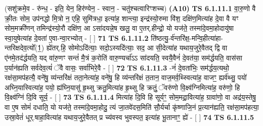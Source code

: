 \documentclass[17pt]{extarticle}
\begin{document}
                  \newline
                      (सशु॑क्रमे॒व - रु॑न्ध॒ - इति॒ येन॒ हिर॑ण्येन॒ - स्वान॒ - चतु॑श्चत्वारिꣳशच्च)  \textbf{(A10)} \newline \newline
                                        \textbf{ TS 6.1.11.1} \newline
                  वा॒रु॒णो वै क्री॒तः सोम॒ उप॑नद्धो मि॒त्रो न॒ एहि॒ सुमि॑त्रधा॒ इत्या॑ह॒ शान्त्या॒ इन्द्र॑स्यो॒रुमा वि॑श॒ दक्षि॑ण॒मित्या॑ह दे॒वा वै यꣳ सोम॒मक्री॑णन् तमिन्द्र॑स्यो॒रौ दक्षि॑ण॒ आ ऽसा॑दयन्ने॒ष खलु॒ वा ए॒तर्.हीन्द्रो॒ यो यज॑ते॒ तस्मा॑दे॒वमा॒होदायु॑षा स्वा॒युषेत्या॑ह दे॒वता॑ ए॒वा-न्वा॒रभ्योत् - [  ] \textbf{  71} \newline
                  \newline
                                \textbf{ TS 6.1.11.2} \newline
                  ति॑ष्ठत्यु॒-र्व॑न्तरि॑क्ष॒-मन्वि॒हीत्या॑हा-न्तरिक्षदेव॒त्यो᳚(1॒) ह्ये॑तर्.हि॒ सोमोऽदि॑त्याः॒ सदो॒ऽस्यदि॑त्याः॒ सद॒ आ सी॒देत्या॑ह यथाय॒जुरे॒वैतद् द्वि वा ए॑नमे॒तद॑र्द्धयति॒ यद् वा॑रु॒णꣳ सन्तं॑ मै॒त्रं क॒रोति॑ वारु॒ण्यर्चा॑ऽऽ सा॑दयति॒ स्वयै॒वैनं॑ दे॒वत॑या॒ सम॑र्द्धयति॒ वास॑सा प॒र्यान॑ह्यति सर्वदेव॒त्यं॑ ॅवै वासः॒ सर्वा॑भिरे॒वै - [  ] \textbf{  72} \newline
                  \newline
                                \textbf{ TS 6.1.11.3} \newline
                  -नं॑ दे॒वता॑भिः॒ सम॑र्द्धय॒त्यथो॒ रक्ष॑सा॒मप॑हत्यै॒ वने॑षु॒ व्य॑न्तरि॑क्षं तता॒नेत्या॑ह॒ वने॑षु॒ हि व्य॑न्तरि॑क्षं त॒तान॒ वाज॒मर्व॒थ्स्वित्या॑ह॒ वाजꣳ॒॒ ह्यर्व॑थ्सु॒ पयो॑ अघ्नि॒यास्वित्या॑ह॒ पयो॒ ह्य॑घ्नि॒यासु॑ हृ॒थ्सु क्रतु॒मित्या॑ह हृ॒थ्सु हि क्रतुं॒ ॅवरु॑णो वि॒क्ष्व॑ग्निमित्या॑ह॒ वरु॑णो॒ हि वि॒क्ष्व॑ग्निं दि॒वि सूर्य॒ - [  ] \textbf{  73} \newline
                  \newline
                                \textbf{ TS 6.1.11.4} \newline
                  मित्या॑ह दि॒वि हि सूर्यꣳ॒॒ सोम॒मद्रा॒वित्या॑ह॒ ग्रावा॑णो॒ वा अद्र॑य॒स्तेषु॒ वा ए॒ष सोमं॑ दधाति॒ यो यज॑ते॒ तस्मा॑दे॒वमा॒होदु॒ त्यं जा॒तवे॑दस॒मिति॑ सौ॒र्यर्चा कृ॑ष्णाजि॒नं प्र॒त्यान॑ह्यति॒ रक्ष॑सा॒मप॑हत्या॒ उस्रा॒वेतं॑ धूर्.षाहा॒वित्या॑ह यथाय॒जुरे॒वैतत् प्र च्य॑वस्व भुवस्पत॒ इत्या॑ह भू॒तानाꣳ॒॒ ह्ये॑ - [  ] \textbf{  74} \newline
                  \newline
                                \textbf{ TS 6.1.11.5} \newline
\end{document}
